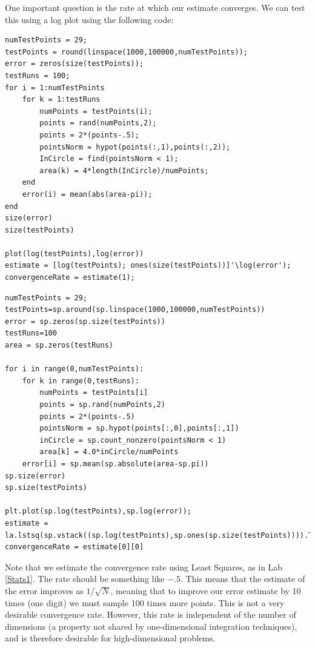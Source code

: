One important question is the rate at which our estimate converges. We can test this using a log plot using the following code:
\begin{matlab}
\begin{lstlisting}[style=matlab]
numTestPoints = 29;
testPoints = round(linspace(1000,100000,numTestPoints));
error = zeros(size(testPoints));
testRuns = 100;
for i = 1:numTestPoints
    for k = 1:testRuns
        numPoints = testPoints(i);
        points = rand(numPoints,2);
        points = 2*(points-.5);
        pointsNorm = hypot(points(:,1),points(:,2));
        InCircle = find(pointsNorm < 1);
        area(k) = 4*length(InCircle)/numPoints;
    end
    error(i) = mean(abs(area-pi));
end
size(error)
size(testPoints)

plot(log(testPoints),log(error))
estimate = [log(testPoints); ones(size(testPoints))]'\log(error');
convergenceRate = estimate(1);
\end{lstlisting}
\end{matlab}

\begin{python}
\begin{lstlisting}[style=python]
numTestPoints = 29;
testPoints=sp.around(sp.linspace(1000,100000,numTestPoints))
error = sp.zeros(sp.size(testPoints))
testRuns=100
area = sp.zeros(testRuns)

for i in range(0,numTestPoints):
	for k in range(0,testRuns):
		numPoints = testPoints[i]
		points = sp.rand(numPoints,2)
		points = 2*(points-.5)
		pointsNorm = sp.hypot(points[:,0],points[:,1])
		inCircle = sp.count_nonzero(pointsNorm < 1)
		area[k] = 4.0*inCircle/numPoints
	error[i] = sp.mean(sp.absolute(area-sp.pi))
sp.size(error)
sp.size(testPoints)

plt.plot(sp.log(testPoints),sp.log(error));
estimate = la.lstsq(sp.vstack((sp.log(testPoints),sp.ones(sp.size(testPoints)))).T,sp.log(error))
convergenceRate = estimate[0][0]
\end{lstlisting}
\end{python}

Note that we estimate the convergence rate using Least Squares, as in Lab \ref{Stats1}. The rate should be something like $-.5$. This means that the estimate of the error improves as $1/\sqrt{N}$, meaning that to improve our error estimate by 10 times (one digit) we must sample 100 times more points. This is not a very desirable convergence rate. However, this rate is independent of the number of dimensions (a property not shared by one-dimensional integration techniques), and is therefore desirable for high-dimensional problems.

